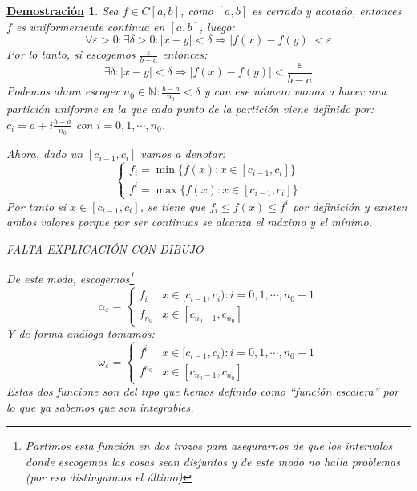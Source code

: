 \documentclass[10pt,a4paper,openright]{book}
\theoremstyle{break}
\newtheorem*{demo}{\underline{Demostración}}
\begin{document}
\begin{demo}
Sea $f\in C[a,b]$, como $[a,b]$ es cerrado y acotado, entonces $f$ es uniformemente continua en $[a,b]$, luego:
$$\forall \varepsilon > 0: \exists \delta> 0: |x-y|<\delta\Rightarrow |f(x)-f(y)|<\varepsilon$$
Por lo tanto, si escogemos $\frac{\varepsilon}{b-a}$ entonces:
$$\exists \delta : |x-y|<\delta \Rightarrow |f(x)-f(y)|<\frac{\varepsilon}{b-a}$$
Podemos ahora escoger $n_0\in \mathbb N: \frac{b-a}{n_0}<\delta$ y con ese número vamos a hacer una partición uniforme en la que cada punto de la partición viene definido por: $c_i = a+ i \frac{b-a}{n_0}$ con $i = 0, 1, \cdots , n_0$.

Ahora, dado un $[c_{i-1}, c_i]$ vamos a denotar:
$$\begin{cases} f_i = \min\{ f(x): x\in [c_{i-1},c_i]\} \\ f^i = \max\{f(x): x\in [c_{i-1},c_i]\}\end{cases}$$
Por tanto si $x\in [c_{i-1},c_i]$, se tiene que $f_i\leq f(x)\leq f^i$ por definición y existen ambos valores porque por ser continuas se alcanza el máximo y el mínimo.

FALTA EXPLICACIÓN CON DIBUJO

De este modo, escogemos\footnote{Partimos esta función en dos trozos para asegurarnos de que los intervalos donde escogemos las cosas sean disjuntos y de este modo no halla problemas (por eso distinguimos el último)}
$$\alpha_\varepsilon = \begin{cases} f_i & x\in [c_{i-1},c_i): i = 0,1,\cdots , n_0-1 \\ f_{n_0}  & x\in[c_{n_0-1},c_{n_0}] \end{cases}$$
Y de forma análoga tomamos:
$$\omega_\varepsilon = \begin{cases} f^{i} & x\in [c_{i-1},c_i): i = 0,1,\cdots , n_0-1 \\ f^{n_0}  & x\in[c_{n_0-1},c_{n_0}] \end{cases}$$
Estas dos funcione son del tipo que hemos definido como ``función escalera'' por lo que ya sabemos que son integrables.


\end{demo}
\end{document}
